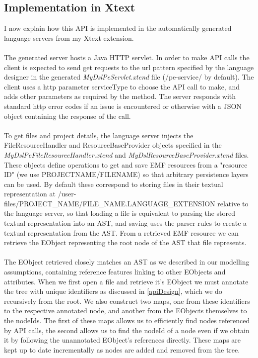 \documentclass{article}
\begin{document}
{\subsection{Implementation in Xtext}
I now explain how this API is implemented in the automatically generated language servers from my Xtext extension.
\\
\\
The generated server hosts a Java HTTP servlet. In order to make API calls the client is expected to send get requests to the url pattern specified by the language designer in the generated \emph{MyDslPeServlet.xtend} file (/pe-service/ by default). The client uses a http parameter serviceType to choose the API call to make, and adds other parameters as required by the method. The server responds with standard http error codes if an issue is encountered or  otherwise with a JSON object containing the response of the call.
\\
\\
To get files and project details, the language server injects the FileResourceHandler and ResourceBaseProvider objects specified in the \emph{MyDslPeFileResourceHandler.xtend} and \emph{MyDslResourceBaseProvider.xtend} files. These objects define operations to get and save EMF resources from a "resource ID" (we use PROJECTNAME/FILENAME) so that arbitrary persistence layers can be used. By default these correspond to storing files in their textual representation at /user-files/PROJECT_NAME/FILE_NAME.LANGUAGE_EXTENSION relative to the language server, so that loading a file is equivalent to parsing the stored textual representation into an AST, and saving uses the parser rules to create a textual representation from the AST. From a retrieved EMF resource we can retrieve the EObject representing the root node of the AST that file represents.
\\
\\
The EObject retrieved closely matches an AST as we described in our modelling assumptions, containing reference features linking to other EObjects and attributes. When we first open a file and retrieve it's EObject we must annotate the tree with unique identifiers as discussed in \ref{apiDesign}, which we do recursively from the root. We also construct two maps, one from these identifiers to the respective annotated node, and another from the EObjects themselves to the nodeIds. The first of these maps allows us to efficiently find nodes referenced by API calls, the second allows us to find the nodeId of a node even if we obtain it by following the unannotated EObject's references directly. These maps are kept up to date incrementally as nodes are added and removed from the tree.
}
\end{document}
